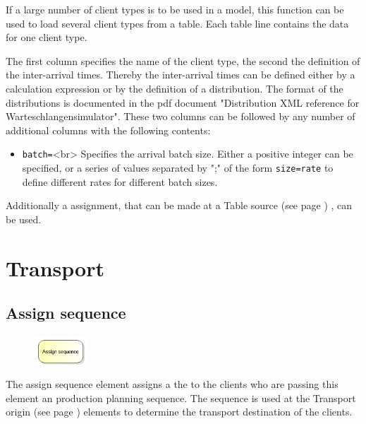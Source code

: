 If a large number of client types is to be used in a model, this function can be used
to load several client types from a table. Each table line contains the data for one client type.

The first column specifies the name of the client type, the second the definition of the inter-arrival times.
Thereby the inter-arrival times can be defined either by a calculation expression or by the definition of a
distribution. The format of the distributions is documented in the pdf document
"Distribution XML reference for Warteschlangensimulator". These two columns can be followed by any number
of additional columns with the following contents:

\begin{itemize}
  \item \texttt{batch=}<br>
  Specifies the arrival batch size. Either a positive integer can be specified, or a series of values separated
  by ";" of the form \texttt{size=rate} to define different rates for different batch sizes. 
\end{itemize}

Additionally a assignment, that can be made at a Table source (see page \pageref{ref:ModelElementSourceTable}) , can be used.





\chapter{Transport}

\section{Assign sequence}
\label{ref:ModelElementAssignSequence}

\begin{figure}
\vspace{-22pt}
\includegraphics[width=2cm]{imageModelElementAssignSequence.png}
\vspace{-22pt}
\end{figure}

The assign sequence element assigns a the to the clients who are passing this element an production planning
sequence. The sequence is used at the Transport origin (see page \pageref{ref:ModelElementTransportSource}) 
elements to determine the transport destination of the clients.

